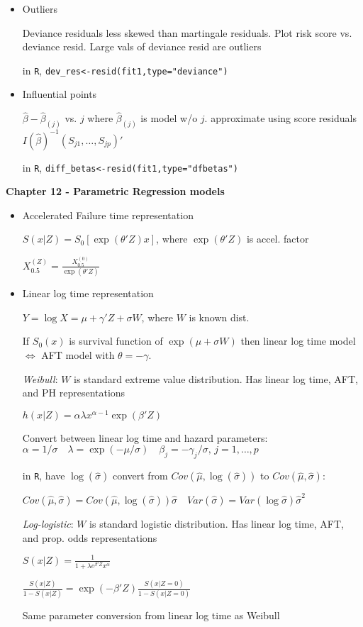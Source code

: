 \documentclass[11pt]{article}
\begin{document}
\begin{itemize}
	\item Outliers
	
	Deviance residuals less skewed than martingale residuals. Plot risk score vs. deviance resid. Large vals of deviance resid are outliers
	
	in \verb|R|, \verb|dev_res<-resid(fit1,type="deviance")|
	
	\item Influential points
	
	$\hat{\beta} - \hat{\beta}_{(j)}$ vs. $j$ where $\hat{\beta}_{(j)}$ is model w/o $j$. approximate using score residuals $I(\hat{\beta})^{-1}(S_{j1},\ldots,S_{jp})'$
	
	in \verb|R|, \verb|diff_betas<-resid(fit1,type="dfbetas")|
	
\end{itemize}


\textbf{Chapter 12 - Parametric Regression models}
\begin{itemize}
	\item Accelerated Failure time representation
	
	$S(x|Z)=S_{0}[\exp(\theta'Z)x]$, where $\exp(\theta'Z)$ is accel. factor
	
	$X_{0.5}^{(Z)}=\frac{X_{0.5}^{(0)}}{\exp(\theta'Z)}$
	
	\item Linear log time representation
	
	$Y=\log X = \mu + \gamma'Z + \sigma W$, where $W$ is known dist.
	
	If $S_0(x)$ is survival function of $\exp(\mu + \sigma W)$ then linear log time model $\Leftrightarrow$ AFT model with $\theta = -\gamma$.
	
	\textsl{Weibull}: $W$ is standard extreme value distribution. Has linear log time, AFT, and PH representations
	
	$h(x|Z)=\alpha \lambda x^{\alpha - 1}\exp(\beta'Z)$
	
	Convert between linear log time and hazard parameters:\\
	$\alpha=1/\sigma \quad \lambda=\exp(-\mu/\sigma) \quad \beta_j=-\gamma_j/\sigma,\, j=1,\ldots,p$
	
	in \verb|R|, have $\log(\hat{\sigma})$ convert from $Cov(\hat{\mu},\log(\hat{\sigma}))$ to $Cov(\hat{\mu},\hat{\sigma})$:
	
	$ Cov(\hat{\mu},\hat{\sigma})= Cov(\hat{\mu}, \log(\hat{\sigma}))\hat{\sigma} \quad 
	Var(\hat{\sigma})=Var(\log\hat{\sigma})\hat{\sigma}^2$
	
	\textsl{Log-logistic}: $W$ is standard logistic distribution. Has linear log time, AFT, and prop. odds representations
	
	$S(x|Z)=\frac{1}{1+\lambda e^{\beta'Z}x^{\alpha} }$
	
	$\frac{S(x|Z)}{1-S(x|Z)}=\exp(-\beta'Z)
	\frac{S(x|Z=0)}{1-S(x|Z=0)}$
	
	Same parameter conversion from linear log time as Weibull	
\end{itemize}
\end{document}
